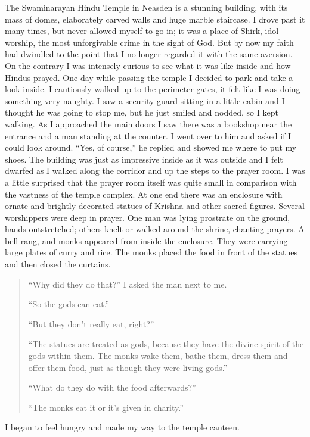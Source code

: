 \documentclass[12pt]{memoir}
\begin{document}
The Swaminarayan Hindu Temple in Neasden is a stunning building,
with its mass of domes, elaborately carved walls and huge marble staircase.
I drove past it many times, but never allowed myself to go in;
it was a place of Shirk, idol worship,
the most unforgivable crime in the sight of God.
But by now my faith had dwindled to the point
that I no longer regarded it with the same aversion.
On the contrary I was intensely curious to see
what it was like inside and how Hindus prayed.
One day while passing the temple I decided to park and take a look inside.
I cautiously walked up to the perimeter gates,
it felt like I was doing something very naughty.
I saw a security guard sitting in a little cabin
and I thought he was going to stop me,
but he just smiled and nodded, so I kept walking.
As I approached the main doors I saw there was a bookshop
near the entrance and a man standing at the counter.
I went over to him and asked if I could look around.
“Yes, of course,” he replied and showed me where to put my shoes.
The building was just as impressive inside as it was outside
and I felt dwarfed as I walked along the corridor
and up the steps to the prayer room.
I was a little surprised that the prayer room itself
was quite small in comparison with the vastness of the temple complex.
At one end there was an enclosure with ornate and brightly decorated
statues of Krishna and other sacred figures.
Several worshippers were deep in prayer.
One man was lying prostrate on the ground, hands outstretched;
others knelt or walked around the shrine, chanting prayers.
A bell rang, and monks appeared from inside the enclosure.
They were carrying large plates of curry and rice.
The monks placed the food in front of the statues and then closed the curtains.

\begin{quote}
“Why did they do that?” I asked the man next to me.

“So the gods can eat.”

“But they don’t really eat, right?”

“The statues are treated as gods,
because they have the divine spirit of the gods within them.
The monks wake them, bathe them, dress them and offer them food,
just as though they were living gods.”

“What do they do with the food afterwards?”

“The monks eat it or it’s given in charity.”
\end{quote}

I began to feel hungry and made my way to the temple canteen.
\end{document}
